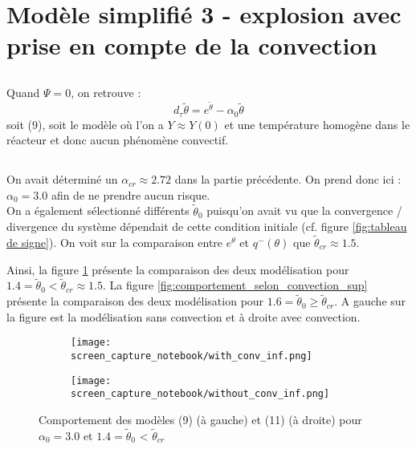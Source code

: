 \documentclass[10pt,a4paper]{report}
\begin{document}
\section{Modèle simplifié 3 - explosion avec prise en compte de la convection}

\subsection{} %

Quand $\Psi = 0$, on retrouve : 
$$ d_\tau\tilde{\theta} = e^{\tilde{\theta}} - \alpha_0 \tilde{\theta} $$
soit (9), soit le modèle où l'on a $Y \approx Y(0)$ et une température homogène dans le réacteur et donc aucun phénomène convectif.

\subsection{} %

On avait déterminé un $\alpha_{cr} \approx 2.72$ dans la partie précédente. On prend donc ici : $\alpha_0 = 3.0$ afin de ne prendre aucun risque. \\

On a également sélectionné différents $\tilde{\theta}_0$ puisqu'on avait vu que la convergence / divergence du système dépendait de cette condition initiale (cf. figure \ref{fig:tableau de signe}). On voit sur la comparaison entre $e^{\theta}$ et $q^{-}(\theta)$ que $\tilde{\theta}_{cr} \approx 1.5$.  

Ainsi, la figure \ref{fig:comportement_selon_convection_inf} présente la comparaison des deux modélisation pour $1.4 = \tilde{\theta}_0 < \tilde{\theta}_{cr} \approx 1.5$. La figure \ref{fig:comportement_selon_convection_sup} présente la comparaison des deux modélisation pour $1.6 = \tilde{\theta}_0 \geq \tilde{\theta}_{cr}$. A gauche sur la figure est la modélisation sans convection et à droite avec convection. 

\begin{figure}
		\centering
		\begin{subfigure}{}
        	\texttt{[image: screen\_capture\_notebook/with\_conv\_inf.png]}
    	\end{subfigure}
		\centering  	
   		\begin{subfigure}{}
        	\texttt{[image: screen\_capture\_notebook/without\_conv\_inf.png]}
    	\end{subfigure}
   	\caption{Comportement des modèles (9) (à gauche) et (11) (à droite) pour $\alpha_0 = 3.0$ et $1.4 = \tilde{\theta}_0$ < $\tilde{\theta}_{cr}$}
    \label{fig:comportement_selon_convection_inf}
	\end{figure}
\end{document}
